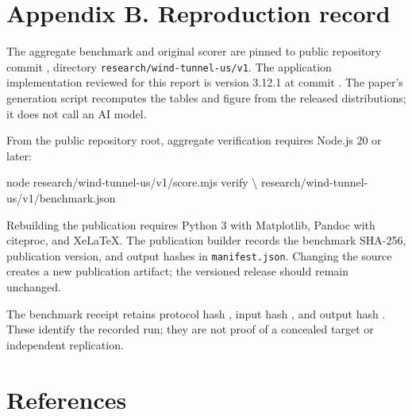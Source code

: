 \documentclass[
  11pt,
]{article}
\newenvironment{Shaded}{}{}
\newcommand{\DataTypeTok}[1]{\textcolor[rgb]{0.56,0.13,0.00}{#1}}
\newcommand{\ExtensionTok}[1]{#1}
\newcommand{\NormalTok}[1]{#1}
\let\originalsection\section
\renewcommand{\section}{\Needspace{5\baselineskip}\originalsection}
\begin{document}
\section*{Appendix B. Reproduction
record}\label{appendix-b.-reproduction-record}

The aggregate benchmark and original scorer are pinned to public
repository commit
\texttt{}, directory
\texttt{research/wind-tunnel-us/v1}. The application implementation
reviewed for this report is version 3.12.1 at commit
\texttt{}. The
paper's generation script recomputes the tables and figure from the
released distributions; it does not call an AI model.

From the public repository root, aggregate verification requires Node.js
20 or later:

\begin{Shaded}
\begin{Highlighting}[]
\ExtensionTok{node}\NormalTok{ research/wind{-}tunnel{-}us/v1/score.mjs verify }\DataTypeTok{\textbackslash{}}
\NormalTok{  research/wind{-}tunnel{-}us/v1/benchmark.json}
\end{Highlighting}
\end{Shaded}

Rebuilding the publication requires Python 3 with Matplotlib, Pandoc
with citeproc, and XeLaTeX. The publication builder records the
benchmark SHA-256, publication version, and output hashes in
\texttt{manifest.json}. Changing the source creates a new publication
artifact; the versioned release should remain unchanged.

The benchmark receipt retains protocol hash
\texttt{},
input hash
\texttt{},
and output hash
\texttt{}.
These identify the recorded run; they are not proof of a concealed
target or independent replication.

\section*{References}\label{references}
\end{document}
